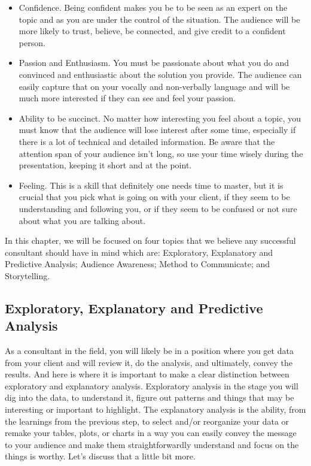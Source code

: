 \documentclass[
]{book}
\begin{document}
\begin{itemize}
\item
  Confidence. Being confident makes you be to be seen as an expert on the topic and as you are under the control of the situation. The audience will be more likely to trust, believe, be connected, and give credit to a confident person.
\item
  Passion and Enthusiasm. You must be passionate about what you do and convinced and enthusiastic about the solution you provide. The audience can easily capture that on your vocally and non-verbally language and will be much more interested if they can see and feel your passion.
\item
  Ability to be succinct. No matter how interesting you feel about a topic, you must know that the audience will lose interest after some time, especially if there is a lot of technical and detailed information. Be aware that the attention span of your audience isn't long, so use your time wisely during the presentation, keeping it short and at the point.
\item
  Feeling. This is a skill that definitely one needs time to master, but it is crucial that you pick what is going on with your client, if they seem to be understanding and following you, or if they seem to be confused or not sure about what you are talking about.
\end{itemize}

In this chapter, we will be focused on four topics that we believe any successful consultant should have in mind which are: Exploratory, Explanatory and Predictive Analysis; Audience Awareness; Method to Communicate; and Storytelling.

\hypertarget{exploratory-explanatory-and-predictive-analysis}{%
\subsection{Exploratory, Explanatory and Predictive Analysis}\label{exploratory-explanatory-and-predictive-analysis}}

As a consultant in the field, you will likely be in a position where you get data from your client and will review it, do the analysis, and ultimately, convey the results. And here is where it is important to make a clear distinction between exploratory and explanatory analysis. Exploratory analysis in the stage you will dig into the data, to understand it, figure out patterns and things that may be interesting or important to highlight. The explanatory analysis is the ability, from the learnings from the previous step, to select and/or reorganize your data or remake your tables, plots, or charts in a way you can easily convey the message to your audience and make them straightforwardly understand and focus on the things is worthy. Let's discuss that a little bit more.
\end{document}
